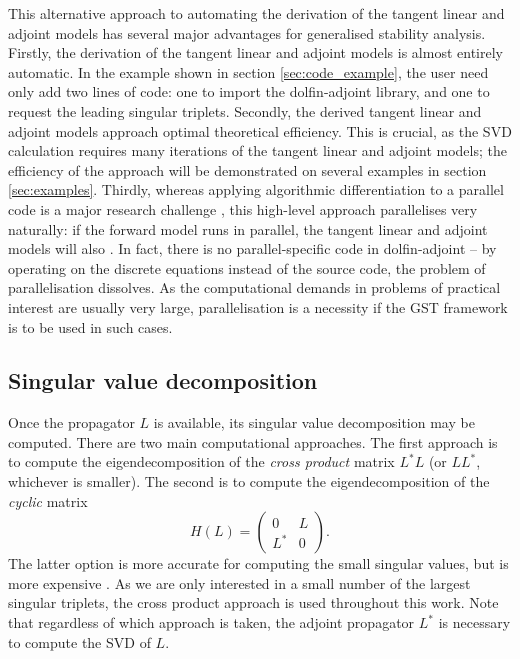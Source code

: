 \documentclass{siamltex}
\begin{document}
This alternative approach to automating the derivation of the tangent linear and adjoint models has several major
advantages for generalised stability analysis. Firstly, the derivation of the tangent linear and adjoint models is
almost entirely automatic. In the example shown in section \ref{sec:code_example}, the user need only add two lines of
code: one to import the dolfin-adjoint library, and one to request the leading singular triplets. Secondly, the derived
tangent linear and adjoint models approach optimal theoretical efficiency. This is crucial, as the
SVD calculation requires many iterations of the tangent linear and adjoint models; the efficiency of the approach will be
demonstrated on several examples in section \ref{sec:examples}. Thirdly, whereas applying algorithmic
differentiation to a parallel code is a major research challenge \cite{utke2009,forster2011}, this high-level approach
parallelises very naturally: if the forward model runs in parallel, the tangent linear and adjoint models will also \cite{farrell2012b}. In
fact, there is no parallel-specific code in dolfin-adjoint -- by operating on the discrete
equations instead of the source code, the problem of parallelisation dissolves. As the computational demands in problems
of practical interest are usually very large, parallelisation is a necessity if the GST framework is to be used in such
cases.

\subsection{Singular value decomposition} \label{sec:svd}
Once the propagator $L$ is available, its singular value decomposition may be computed. 
There are two main computational approaches. The first approach is to compute the eigendecomposition 
of the \emph{cross product} matrix $L^*L$ (or $LL^*$, whichever is smaller). The second is to
compute the eigendecomposition of the \emph{cyclic} matrix 
\begin{equation}
H(L) = 
\begin{pmatrix} 0 & L \\
              L^* & 0
\end{pmatrix}.
\end{equation}
The latter option is more accurate for computing the
small singular values, but is more expensive \cite{trefethen1997}. As we are only interested in a small number of
the largest singular triplets, the cross product approach is used throughout this work. Note
that regardless of which approach is taken, the adjoint propagator $L^*$ is necessary
to compute the SVD of $L$.
\end{document}
